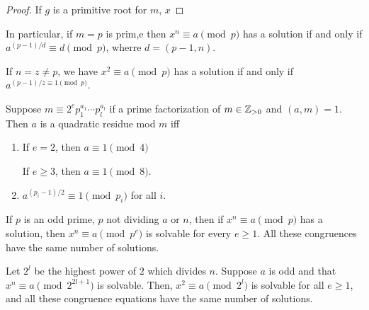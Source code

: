 \documentclass{article}
\begin{document}
\begin{proof}
    If $g$ is a primitive root for $m$, $x $
\end{proof}

In particular, if $m = p$ is prim,e then $x^n \equiv a \pmod p$ has a solution if and only if $a^{(p-1)/d} \equiv d \pmod p$, wherre $d = (p-1, n)$.

If $n = z \neq p$, we have $x^2 \equiv a \pmod p$ has a solution if and only if $a^{(p-1)/z \equiv 1 \pmod p}$.

\begin{lemma}
    Suppose $m \equiv 2^e p_1^{a_1} \cdots p_l^{a_l}$ if a prime factorization of $m \in \mathbb Z_{> 0}$ and $(a, m) = 1$. Then $a$ is a quadratic residue mod $m$ iff 
    \begin{enumerate}[label=(\alph*)]
        \item If $e = 2$, then $a \equiv 1 \pmod 4$

        If $e \geq 3$, then $a \equiv 1 \pmod 8$.
        \item $a^{(p_i - 1)/2} \equiv 1 \pmod{p_i}$ for all $i$.
    \end{enumerate}
\end{lemma}

\begin{lemma}
    If $p$ is an odd prime, $p$ not dividing $a$ or $n$, then if $x^n \equiv a \pmod p$ has a solution, then $x^n \equiv a \pmod{p^e}$ is solvable for every $e \geq 1$. All these congruences have the same number of solutions.
\end{lemma}

\begin{lemma}
    Let $2^l$ be the highest power of $2$ which divides $n$. Suppose $a$ is odd and that $x^n \equiv a \pmod{2^{2l + 1}}$ is solvable. Then, $x^2 \equiv a \pmod{2^l}$ is solvable for all $e \geq 1$, and all these congruence equations have the same number of solutions.
\end{lemma}
\end{document}
